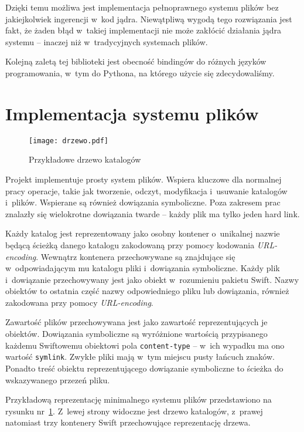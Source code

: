 Dzięki temu możliwa jest implementacja pełnoprawnego systemu plików bez
jakiejkolwiek ingerencji w~kod jądra. Niewątpliwą wygodą tego rozwiązania
jest fakt, że żaden błąd w~takiej implementacji nie może zakłócić działania
jądra systemu -- inaczej niż w~tradycyjnych systemach plików.

Kolejną zaletą tej biblioteki jest obecność bindingów do różnych języków
programowania, w~tym do Pythona, na którego użycie się zdecydowaliśmy.

\section{Implementacja systemu plików}

\begin{figure}
    \centering
    \texttt{[image: drzewo.pdf]}
    \caption{Przykładowe drzewo katalogów}
	\label{fig:drzewo}
\end{figure}

Projekt \cb{} implementuje prosty system plików. Wspiera kluczowe dla normalnej
pracy operacje, takie jak tworzenie, odczyt, modyfikacja i~usuwanie katalogów
i~plików. Wspierane są również dowiązania symboliczne. Poza zakresem prac
znalazły się wielokrotne dowiązania twarde -- każdy plik ma tylko jeden hard
link.

Każdy katalog jest reprezentowany jako osobny kontener o~unikalnej nazwie będącą
ścieżką danego katalogu zakodowaną przy pomocy kodowania \textit{URL-encoding}.
Wewnątrz kontenera przechowywane są znajdujące się w~odpowiadającym mu katalogu
pliki i~dowiązania symboliczne. Każdy plik i~dowiązanie przechowywany jest jako
obiekt w~rozumieniu pakietu Swift. Nazwy obiektów to ostatnia część nazwy
odpowiedniego pliku lub dowiązania, również zakodowana przy pomocy
\textit{URL-encoding}.

Zawartość plików przechowywana jest jako zawartość reprezentujących je obiektów.
Dowiązania symboliczne są wyróżnione wartością przypisanego każdemu Swiftowemu
obiektowi pola \texttt{content-type} -- w~ich wypadku ma ono wartość
\texttt{symlink}. Zwykłe pliki mają w~tym miejscu pusty łańcuch znaków. Ponadto
treść obiektu reprezentującego dowiązanie symboliczne to ścieżka do wskazywanego
przezeń pliku.

Przykładową reprezentację minimalnego systemu plików przedstawiono na rysunku
nr~\ref{fig:drzewo}. Z~lewej strony widoczne jest drzewo katalogów, z~prawej
natomiast trzy kontenery Swift przechowujące reprezentację drzewa.

